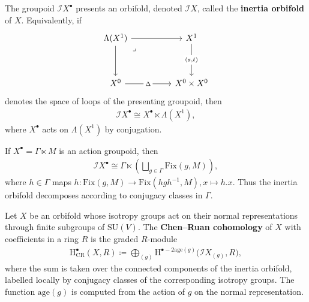 \documentclass[psamsfonts]{amsart}
\theoremstyle{plain}
\theoremstyle{definition}{
\newtheorem{defi}{Definition}[section]
\newtheorem{ass}{Assumption}
\newtheorem*{nota}{Notation}}
\theoremstyle{remark}{
\newtheorem{rem}{Remark}
\newtheorem{ex}{Example}}
\theoremstyle{plain}{
\newtheorem{thm}{Theorem}[section]
\newtheorem{lem}{Lemma}[section]
\newtheorem{cor}{Corollary}[section]
\newtheorem{prop}{Proposition}[section]
\newtheorem{con}{Conjecture}[section]}
\newcommand{\m}[1]{{\mathrm{#1}}}
\begin{document}
The groupoid $\mathcal{I}X^\bullet$ presents an orbifold, denoted
$\mathcal{I}X$, called the \textbf{inertia orbifold} of $X$. Equivalently, if
\begin{equation*}
\begin{tikzcd}
	{\Lambda(X^1)} && {X^1} \\
	\\
	{X^0} && {X^0\times X^0}
	\arrow[from=1-1, to=1-3]
	\arrow[from=1-1, to=3-1]
	\arrow["\lrcorner"{anchor=center, pos=0.125}, draw=none, from=1-1, to=3-3]
	\arrow["{(s,t)}"{description}, from=1-3, to=3-3]
	\arrow["\Delta"{description}, from=3-1, to=3-3]
\end{tikzcd}
\end{equation*}
denotes the space of loops of the presenting groupoid, then
\begin{align*}
        \mathcal{I}X^\bullet
        \cong
        X^\bullet\ltimes \Lambda(X^1),
\end{align*}
where $X^\bullet$ acts on $\Lambda(X^1)$ by conjugation.

\begin{ex}
If $X^\bullet=\Gamma\ltimes M$ is an action groupoid, then
\begin{align*}
        \mathcal{I}X^\bullet
        \cong
        \Gamma\ltimes
        \left(
            \bigsqcup_{g\in\Gamma}\m{Fix}(g,M)
        \right),
\end{align*}
where $h\in\Gamma$ maps $h\colon \m{Fix}(g,M)\rightarrow\m{Fix}(hgh^{-1},M), x\longmapsto h.x$. Thus the inertia orbifold decomposes according to conjugacy classes in
$\Gamma$.
\end{ex}

\begin{defi}
Let $X$ be an orbifold whose isotropy groups act on their normal
representations through finite subgroups of $\m{SU}(V)$. The
\textbf{Chen--Ruan cohomology} of $X$ with coefficients in a ring $R$ is the
graded $R$-module
\begin{align*}
        \m{H}^\bullet_{\m{CR}}(X,R)
        \coloneqq
        \bigoplus_{(g)}
        \m{H}^{\bullet-2\m{age}(g)}
        \bigl(\mathcal{I}X_{(g)},R\bigr),
\end{align*}
where the sum is taken over the connected components of the inertia orbifold,
labelled locally by conjugacy classes of the corresponding isotropy groups.
The function $\m{age}(g)$ is computed from the action of $g$ on the normal
representation.
\end{defi}
\end{document}
